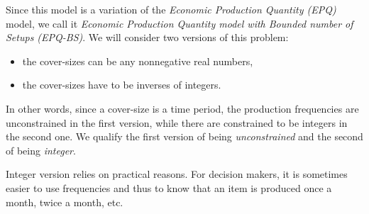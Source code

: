 

\medskip


Since this model is a variation of the \emph{Economic Production Quantity (EPQ)} model, we call it \emph{Economic Production Quantity model with Bounded number of Setups (EPQ-BS)}.
We will consider two versions of this problem:
\begin{itemize}
  \item the cover-sizes can be any nonnegative real numbers,
  \item the cover-sizes have to be inverses of integers.
\end{itemize}
In other words, since a cover-size is a time period, the production frequencies are unconstrained in the first version, while there are constrained to be integers in the second one.
We qualify the first version of being {\em unconstrained} and the second of being {\em integer}.


Integer version relies on practical reasons.
For decision makers, it is sometimes easier to use frequencies and thus to know that an item is produced once a month, twice a month, etc.



